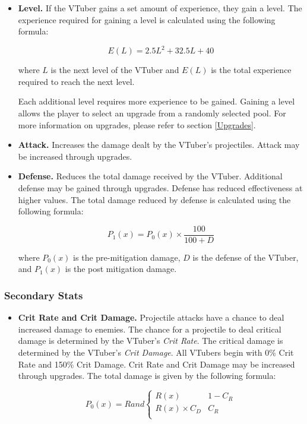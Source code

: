 \documentclass[10pt, a4paper]{article}
\begin{document}
\begin{multicols}{2}
\begin{itemize}
  	\item \textbf{Level.} If the VTuber gains a set amount of experience, they gain a level. The experience required for gaining a level is calculated using the following formula:
  	
  	\[E(L) = 2.5L^2 + 32.5L + 40\]
  	
  	where $L$ is the next level of the VTuber and $E(L)$ is the total experience required to reach the next level.
  	
  	Each additional level requires more experience to be gained. Gaining a level allows the player to select an upgrade from a randomly selected pool. For more information on upgrades, please refer to section \ref{Upgrades}.
  	
  	\item \textbf{Attack.} Increases the damage dealt by the VTuber's projectiles. Attack may be increased through upgrades.

  	\item\textbf{Defense.} Reduces the total damage received by the VTuber. Additional defense may be gained through upgrades. Defense has reduced effectiveness at higher values. The total damage reduced by defense is calculated using the following formula:
  	
  	\[P_1(x) = P_0(x) \times \frac{100}{100+D}\]
  	
  	where $P_0(x)$ is the pre-mitigation damage, $D$ is the defense of the VTuber, and $P_1(x)$ is the post mitigation damage.
  	
  	\end{itemize}
  	
  	\subsubsection{Secondary Stats}
  	
  	\begin{itemize}
  	 \item \textbf{Crit Rate and Crit Damage.} Projectile attacks have a chance to deal increased damage to enemies. The chance for a projectile to deal critical damage is determined by the VTuber's \textit{Crit Rate}. The critical damage is determined by the VTuber's \textit{Crit Damage}. All VTubers begin with 0\% Crit Rate and 150\% Crit Damage. Crit Rate and Crit Damage may be increased through upgrades. The total damage is given by the following formula:

  	 \[
	  	 P_0(x) = Rand\begin{cases}
	  	 	R(x) & 1 - C_R\\
	  	 	R(x) \times C_D & C_R \\
	  	 \end{cases}
  	 \]
  	 

\end{itemize}
\end{multicols}
\end{document}
